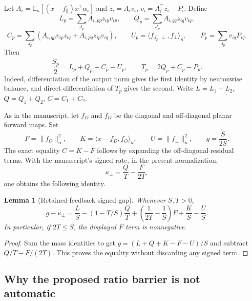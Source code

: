 \documentclass{article} %
\theoremstyle{plain}
\newtheorem{lemma}[theorem]{Lemma}
\theoremstyle{definition}
\theoremstyle{remark}
\begin{document}
Let $A_i=\mathbb E_n[(x-f_\parallel)x^\top\alpha_i]$ and
$\dot z_i=A_iv_i$, $\dot v_i=A_i^\top z_i-P_i$.
Define
\[
 L_p=\sum_{J_p}A_{i,pp}z_{ip}v_{ip},\qquad
 Q_p=\sum_{J_p}A_{i,qq}z_{iq}v_{iq},
\]
\[
 C_p=\sum_{J_p}(A_{i,qp}v_{ip}z_{iq}
                       +A_{i,pq}z_{ip}v_{iq}),\qquad
 U_p=\langle f_{J_p,\perp},f_\perp\rangle_n,\qquad
 P_p=\sum_{J_p}v_{iq}P_{iq}.
\]
Then
\begin{equation}\label{sbgap:groups}
 \frac{\dot S_p}{2}=L_p+Q_p+C_p-U_p,\qquad
 \dot T_p=2Q_p+C_p-P_p.
\end{equation}
Indeed, differentiation of the output norm gives the first identity
by neuronwise balance, and direct differentiation of $T_p$ gives the
second. Write $L=L_1+L_2$, $Q=Q_1+Q_2$, $C=C_1+C_2$.

As in the manuscript, let $f_D$ and $f_O$ be the diagonal and off-diagonal
planar forward maps. Set
\[
 F=\|f_O\|_n^2,\qquad K=\langle x-f_D,f_O\rangle_n,\qquad
 U=\|f_\perp\|_n^2,\qquad g=\frac{\dot S}{2S}.
\]
The exact equality $C=K-F$ follows by expanding the off-diagonal residual
terms. With the manuscript's signed rate, in the present normalization,
\[
 \kappa_\perp=\frac{Q}{T}-\frac{F}{2T},
\]
one obtains the following identity.

\begin{lemma}[Retained-feedback signed gap]\label{sbgap:identity}
Whenever $S,T>0$,
\begin{equation}\label{sbgap:gap-exact}
 g-\kappa_\perp
 =\frac{L}{S}
 -(1-T/S)\frac{Q}{T}
 +\left(\frac1{2T}-\frac1S\right)F+\frac KS-\frac US.
\end{equation}
In particular, if $2T\le S$, the displayed $F$ term is nonnegative.
\end{lemma}
\begin{proof}
Sum the mass identities to get $g=(L+Q+K-F-U)/S$ and subtract
$Q/T-F/(2T)$. This proves the equality without discarding any signed term.
\end{proof}

\subsection{Why the proposed ratio barrier is not automatic}
\end{document}
